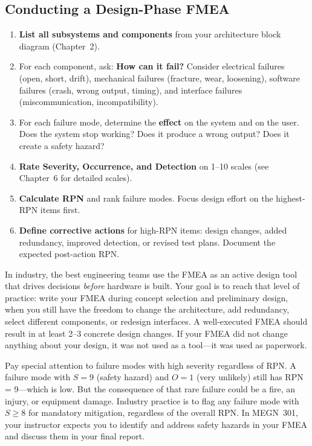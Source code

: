 \documentclass[11pt,letterpaper,twoside,openany]{book}
\begin{document}
\subsection{Conducting a Design-Phase FMEA}
\begin{enumerate}[leftmargin=1.5em]
\item \textbf{List all subsystems and components} from your architecture block diagram (Chapter~2).
\item For each component, ask: \textbf{How can it fail?} Consider electrical failures (open, short, drift), mechanical failures (fracture, wear, loosening), software failures (crash, wrong output, timing), and interface failures (miscommunication, incompatibility).
\item For each failure mode, determine the \textbf{effect} on the system and on the user. Does the system stop working? Does it produce a wrong output? Does it create a safety hazard?
\item \textbf{Rate Severity, Occurrence, and Detection} on 1--10 scales (see Chapter~6 for detailed scales).
\item \textbf{Calculate RPN} and rank failure modes. Focus design effort on the highest-RPN items first.
\item \textbf{Define corrective actions} for high-RPN items: design changes, added redundancy, improved detection, or revised test plans. Document the expected post-action RPN.
\end{enumerate}

\begin{warningbox}
In industry, the best engineering teams use the FMEA as an active design tool that drives decisions \emph{before} hardware is built. Your goal is to reach that level of practice: write your FMEA during concept selection and preliminary design, when you still have the freedom to change the architecture, add redundancy, select different components, or redesign interfaces. A well-executed FMEA should result in at least 2--3 concrete design changes. If your FMEA did not change anything about your design, it was not used as a tool---it was used as paperwork.
\end{warningbox}

\begin{tipbox}
Pay special attention to failure modes with high severity regardless of RPN. A failure mode with $S = 9$ (safety hazard) and $O = 1$ (very unlikely) still has RPN = 9---which is low. But the consequence of that rare failure could be a fire, an injury, or equipment damage. Industry practice is to flag any failure mode with $S \geq 8$ for mandatory mitigation, regardless of the overall RPN. In MEGN~301, your instructor expects you to identify and address safety hazards in your FMEA and discuss them in your final report.
\end{tipbox}
\end{document}
